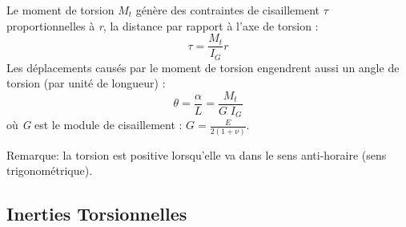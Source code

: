\documentclass[a4paper]{article}
\begin{document}
Le moment de torsion $ M_t $ génère des contraintes de cisaillement $ \tau $ proportionnelles à \emph{r}, la distance par rapport à l'axe de torsion : 
\[ \tau = \frac{M_t}{I_G} r \]
Les déplacements causés par le moment de torsion engendrent aussi un angle de torsion (par unité de longueur) : 
\[ \theta = \frac{\alpha}{L} = \frac{M_t}{G \; I_G} \]
où \emph{G} est le module de cisaillement : $\displaystyle G = \frac{E}{2 (1 + \nu)} $.

Remarque: la torsion est positive lorsqu'elle va dans le sens anti-horaire (sens trigonométrique).





\subsection{Inerties Torsionnelles}
\end{document}
